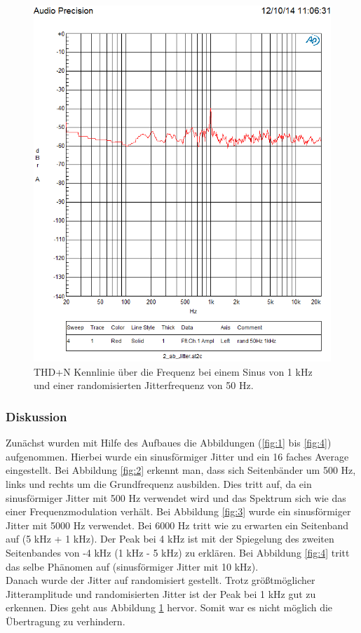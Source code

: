 \begin{figure}[h!]
\centering
\includegraphics[width=\columnwidth]{figures/Aufg2/4.PNG} 
\caption{THD+N Kennlinie über die Frequenz bei einem Sinus von 1 kHz und einer randomisierten Jitterfrequenz von 50 Hz.}
\label{fig:5}
\end{figure}
\clearpage

\subsubsection{Diskussion}
Zunächst wurden mit Hilfe des Aufbaues die Abbildungen (\ref{fig:1} bis \ref{fig:4}) aufgenommen. Hierbei wurde ein sinusförmiger Jitter und ein 16 faches Average eingestellt. Bei Abbildung \ref{fig:2} erkennt man, dass sich Seitenbänder um 500 Hz, links und rechts um die Grundfrequenz ausbilden. Dies tritt auf, da ein sinusförmiger Jitter mit 500 Hz verwendet wird und das Spektrum sich wie das einer Frequenzmodulation verhält. Bei Abbildung \ref{fig:3} wurde ein sinusförmiger Jitter mit 5000 Hz verwendet. Bei 6000 Hz tritt wie zu erwarten ein Seitenband auf (5 kHz + 1 kHz). Der Peak bei 4 kHz ist mit der Spiegelung des zweiten Seitenbandes von -4 kHz (1 kHz - 5 kHz) zu erklären. Bei Abbildung \ref{fig:4} tritt das selbe Phänomen auf (sinusförmiger Jitter mit 10 kHz).
\\
Danach wurde der Jitter auf randomisiert gestellt. Trotz größtmöglicher Jitteramplitude und randomisierten Jitter ist der Peak bei 1 kHz gut zu erkennen. Dies geht aus Abbildung \ref{fig:5} hervor. Somit war es nicht möglich die Übertragung zu verhindern.

